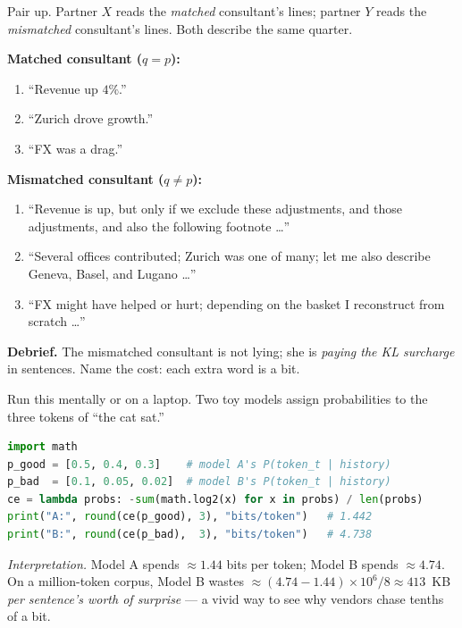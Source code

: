\documentclass[12pt,a4paper]{article}
\theoremstyle{plain}
\theoremstyle{definition}
\begin{document}
\begin{activity}[title={Activity 3.B --- Role-play: the two consultants (3 min)}]
\label{act:consultants}
Pair up.  Partner $X$ reads the \emph{matched} consultant's lines;
partner $Y$ reads the \emph{mismatched} consultant's lines.  Both
describe the same quarter.

\textbf{Matched consultant ($q = p$):}
\begin{enumerate}[leftmargin=*, itemsep=0pt, label=(M\arabic*)]
  \item ``Revenue up $4\%$.''
  \item ``Zurich drove growth.''
  \item ``FX was a drag.''
\end{enumerate}

\textbf{Mismatched consultant ($q \ne p$):}
\begin{enumerate}[leftmargin=*, itemsep=0pt, label=(W\arabic*)]
  \item ``Revenue is up, but only if we exclude these adjustments,
        and those adjustments, and also the following footnote \dots''
  \item ``Several offices contributed; Zurich was one of many; let me
        also describe Geneva, Basel, and Lugano \dots''
  \item ``FX might have helped or hurt; depending on the basket I
        reconstruct from scratch \dots''
\end{enumerate}

\textbf{Debrief.}  The mismatched consultant is not lying; she is
\emph{paying the KL surcharge} in sentences.  Name the cost: each
extra word is a bit.
\end{activity}

\begin{activity}[title={Activity 3.C --- Per-token cross-entropy in 6 lines of Python}]
\label{act:python-sec3}
Run this mentally or on a laptop.  Two toy models assign
probabilities to the three tokens of ``the cat sat.''
\begin{lstlisting}[language=Python]
import math
p_good = [0.5, 0.4, 0.3]    # model A's P(token_t | history)
p_bad  = [0.1, 0.05, 0.02]  # model B's P(token_t | history)
ce = lambda probs: -sum(math.log2(x) for x in probs) / len(probs)
print("A:", round(ce(p_good), 3), "bits/token")   # 1.442
print("B:", round(ce(p_bad),  3), "bits/token")   # 4.738
\end{lstlisting}
\emph{Interpretation.}  Model A spends $\approx 1.44$ bits per
token; Model B spends $\approx 4.74$.  On a million-token corpus,
Model B wastes $\approx (4.74-1.44)\times 10^{6} / 8 \approx 413$~KB
\emph{per sentence's worth of surprise} --- a vivid way to see why
vendors chase tenths of a bit.
\end{activity}
\end{document}
